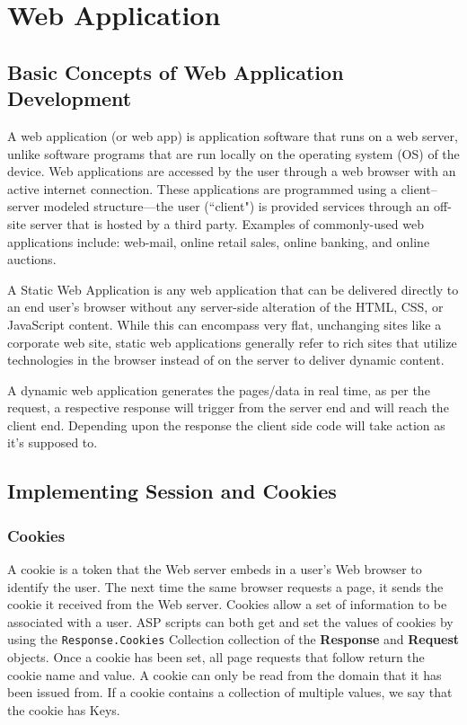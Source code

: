\chapter{Web Application}

\section{Basic Concepts of Web Application Development}
A web application (or web app) is application software that runs on a web server, unlike software programs that are run locally on the operating system (OS) of the device. Web applications are accessed by the user through a web browser with an active internet connection. These applications are programmed using a client–server modeled structure—the user (``client") is provided services through an off-site server that is hosted by a third party. Examples of commonly-used web applications include: web-mail, online retail sales, online banking, and online auctions.

A Static Web Application is any web application that can be delivered directly to an end user's browser without any server-side alteration of the HTML, CSS, or JavaScript content. While this can encompass very flat, unchanging sites like a corporate web site, static web applications generally refer to rich sites that utilize technologies in the browser instead of on the server to deliver dynamic content.

A dynamic web application generates the pages/data in real time, as per the request, a respective response will trigger from the server end and will reach the client end. Depending upon the response the client side code will take action as it's supposed to.



\section{Implementing Session and Cookies}
\subsection{Cookies}
A cookie is a token that the Web server embeds in a user's Web browser to identify the user. The next time the same browser requests a page, it sends the cookie it received from the Web server. Cookies allow a set of information to be associated with a user. ASP scripts can both get and set the values of cookies by using the \texttt{Response.Cookies} {Collection collection} of the \textbf{Response} and \textbf{Request} objects. Once a cookie has been set, all page requests that follow return the cookie name and value. A cookie can only be read from the domain that it has been issued from. If a cookie contains a collection of multiple values, we say that the cookie has Keys.

